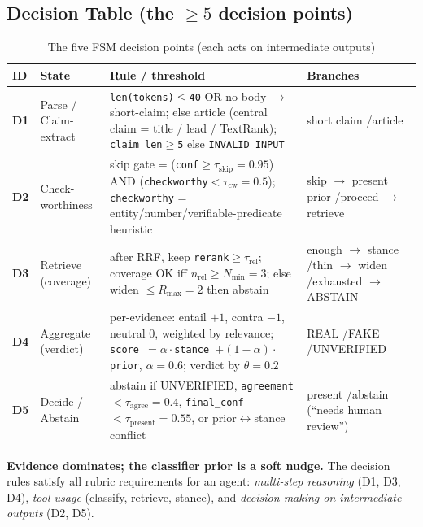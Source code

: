 \documentclass[12pt,a4paper]{article}
\begin{document}
\subsection{Decision Table (the $\geq 5$ decision points)}

\begin{table}[H]
\centering
\caption{The five FSM decision points (each acts on intermediate outputs)}
\small
\begin{tabularx}{\linewidth}{@{} l l L L @{}}
\toprule
\textbf{ID} & \textbf{State} & \textbf{Rule / threshold} & \textbf{Branches} \\
\midrule
\textbf{D1} & Parse / Claim-extract & \texttt{len(tokens)$\leq$40} OR no body $\rightarrow$ short-claim; else article (central claim = title / lead / TextRank); \texttt{claim\_len$\geq$5} else \texttt{INVALID\_INPUT} & short claim \quad/\quad article \\
\textbf{D2} & Check-worthiness & skip gate = (\texttt{conf$\geq\tau_{\text{skip}}{=}0.95$}) AND (\texttt{checkworthy$<\tau_{\text{cw}}{=}0.5$}); \texttt{checkworthy} = entity/number/verifiable-predicate heuristic & skip $\rightarrow$ present prior \quad/\quad proceed $\rightarrow$ retrieve \\
\textbf{D3} & Retrieve (coverage) & after RRF, keep \texttt{rerank$\geq\tau_{\text{rel}}$}; coverage OK iff \texttt{$n_{\text{rel}}\geq N_{\min}{=}3$}; else widen $\leq R_{\max}{=}2$ then abstain & enough $\rightarrow$ stance \quad/\quad thin $\rightarrow$ widen \quad/\quad exhausted $\rightarrow$ ABSTAIN \\
\textbf{D4} & Aggregate (verdict) & per-evidence: entail $+1$, contra $-1$, neutral $0$, weighted by relevance; \texttt{score $= \alpha\cdot$stance $+ (1{-}\alpha)\cdot$prior}, $\alpha{=}0.6$; verdict by $\theta{=}0.2$ & REAL \quad/\quad FAKE \quad/\quad UNVERIFIED \\
\textbf{D5} & Decide / Abstain & abstain if UNVERIFIED, \texttt{agreement$<\tau_{\text{agree}}{=}0.4$}, \texttt{final\_conf$<\tau_{\text{present}}{=}0.55$}, or prior$\leftrightarrow$stance conflict & present \quad/\quad abstain (``needs human review'') \\
\bottomrule
\end{tabularx}
\end{table}

\noindent \textbf{Evidence dominates; the classifier prior is a soft nudge.} The decision rules satisfy all rubric requirements for an agent: \emph{multi-step reasoning} (D1, D3, D4), \emph{tool usage} (classify, retrieve, stance), and \emph{decision-making on intermediate outputs} (D2, D5).
\end{document}
